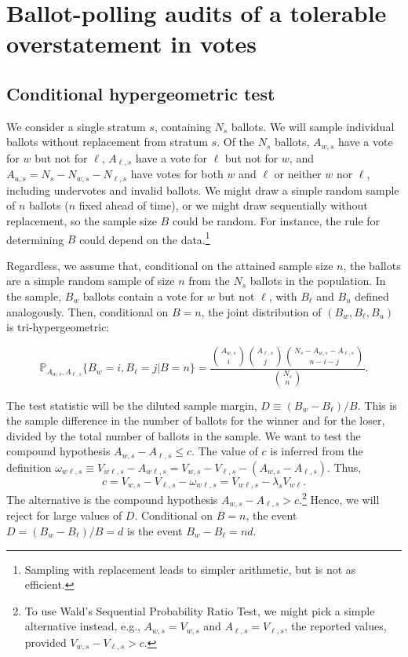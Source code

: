 \section{Ballot-polling audits of a tolerable overstatement in votes}
\label{sec:ballotPollError}

\subsection{Conditional hypergeometric test}

We consider a single stratum $s$, containing $N_s$ ballots.
We will sample individual ballots without replacement from stratum $s$.
Of the $N_s$ ballots,
$A_{w,s}$ have a vote for $w$ but not for $\ell$, $A_{\ell,s}$ have a vote for $\ell$ but not for $w$, and $A_{u,s} = N_s - N_{w,s} - N_{\ell,s}$ have votes for both $w$ and $\ell$ or neither $w$ nor $\ell$, including undervotes and invalid ballots.
We might draw a simple random sample of $n$ ballots ($n$ fixed ahead of time), or we might draw 
sequentially without replacement, so the sample size $B$ could be random.
For instance, the rule for determining $B$ could depend on the data.\footnote{%
   Sampling with replacement leads to simpler arithmetic, but is not as efficient.
}

Regardless, we assume that, conditional on the attained sample size $n$, the ballots are a simple random sample of size $n$ from the $N_s$ ballots in the population.
In the sample, $B_w$ ballots contain a vote for $w$ but not $\ell$, with $B_\ell$ and $B_u$ defined analogously.
Then, conditional on $B=n$, the joint distribution of
$(B_w, B_\ell, B_u)$ is tri-hypergeometric:

\begin{equation}
    \mathbb{P}_{A_{w,s}, A_{\ell,s}} \{ B_w = i, B_\ell = j \vert B=n \} = 
     \frac{ {A_{w,s } \choose i}{A_{\ell,s} \choose j}{N_s - A_{w,s} - A_{\ell,s} \choose n-i-j}}{{N_s \choose n}}.
\end{equation}

The test statistic will be the diluted sample margin, $D \equiv (B_w - B_\ell)/B$.
This is the sample difference in the number of ballots for the winner and for the loser, divided by the 
total number of ballots in the sample.
We want to test the compound hypothesis $A_{w,s} - A_{\ell,s} \le c$.
The value of $c$ is inferred from the definition
$\omega_{w\ell,s} \equiv V_{w\ell,s} - A_{w\ell,s} = V_{w,s} - V_{\ell,s} - (A_{w,s} -A_{\ell,s})$.
Thus,
$$
    c = V_{w,s} - V_{\ell,s} - \omega_{w\ell,s} = V_{w\ell,s} - \lambda_s V_{w\ell}.
$$
The alternative is the compound hypothesis 
$A_{w,s} - A_{\ell,s} > c$.\footnote{%
    To use Wald's Sequential Probability Ratio Test, we might pick a simple alternative instead, e.g.,
   $A_{w,s} = V_{w,s}$ and $A_{\ell,s} = V_{\ell,s}$, the reported values, provided 
   $V_{w,s} - V_{\ell,s} > c$.
}
Hence, we will reject for large values of $D$.
Conditional on $B=n$, the event $D = (B_w - B_\ell)/B = d$ is the event $B_w - B_\ell = nd$.

